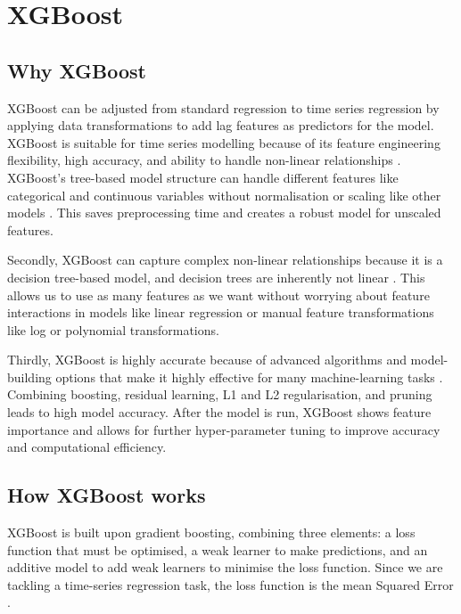 \documentclass[mstat,12pt]{unswthesis}
\begin{document}
\section{XGBoost}\label{xgboost}

\subsection{Why XGBoost}\label{why-xgboost}

XGBoost can be adjusted from standard regression to time series
regression by applying data transformations to add lag features as
predictors for the model. XGBoost is suitable for time series modelling
because of its feature engineering flexibility, high accuracy, and
ability to handle non-linear relationships
\cite{brownlee_gradientboosting2020}. XGBoost's tree-based model
structure can handle different features like categorical and continuous
variables without normalisation or scaling like other models
\cite{ambika_2023_xgboost}. This saves preprocessing time and creates a
robust model for unscaled features.

Secondly, XGBoost can capture complex non-linear relationships because
it is a decision tree-based model, and decision trees are inherently not
linear \cite{ambika_2023_xgboost}. This allows us to use as many
features as we want without worrying about feature interactions in
models like linear regression or manual feature transformations like log
or polynomial transformations.

Thirdly, XGBoost is highly accurate because of advanced algorithms and
model-building options that make it highly effective for many
machine-learning tasks \cite{ambika_2023_xgboost}. Combining boosting,
residual learning, L1 and L2 regularisation, and pruning leads to high
model accuracy. After the model is run, XGBoost shows feature importance
and allows for further hyper-parameter tuning to improve accuracy and
computational efficiency.

\subsection{How XGBoost works}\label{how-xgboost-works}

XGBoost is built upon gradient boosting, combining three elements: a
loss function that must be optimised, a weak learner to make
predictions, and an additive model to add weak learners to minimise the
loss function. Since we are tackling a time-series regression task, the
loss function is the mean Squared Error
\cite{brownlee_gradientboosting2020}.
\end{document}
